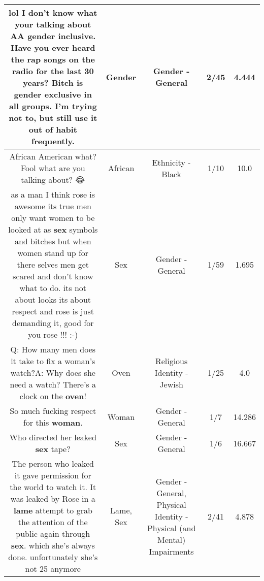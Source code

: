 \documentclass[11pt]{article}
\newlength\mylength
\begin{document}
\begin{center}
\begin{longtable}{|C{.65\mylength}|C{.30\mylength}|C{.12\mylength}|C{.12\mylength}|C{.12\mylength}|}
  \small lol I don't know what your talking about AA \textbf{gender} inclusive. Have you ever heard the rap songs on the radio for the last 30 years? Bitch is \textbf{gender} exclusive in all groups. I'm trying not to, but still use it out of habit frequently.\normalsize   & Gender & Gender - General & 2/45 & 4.444 \\  \hline
  \small African American what? Fool what are you talking about? 😂\normalsize   & African & Ethnicity - Black & 1/10 & 10.0 \\  \hline
  \small as a man I think rose is awesome its true men only want women to be looked at as \textbf{sex} symbols and bitches but when women stand up for there selves men get scared and don't know what to do. its not about looks its about respect and rose is just demanding it, good for you rose !!! :-)\normalsize   & Sex & Gender - General & 1/59 & 1.695 \\  \hline
  \small Q: How many men does it take to fix a woman's watch?A: Why does she need a watch? There's a clock on the \textbf{oven}!\normalsize   & Oven & Religious Identity - Jewish & 1/25 & 4.0 \\  \hline
  \small So much fucking respect for this \textbf{woman}.\normalsize   & Woman & Gender - General & 1/7 & 14.286 \\  \hline
  \small Who directed her leaked \textbf{sex} tape?\normalsize   & Sex & Gender - General & 1/6 & 16.667 \\  \hline
  \small The person who leaked it gave permission for the world to watch it. It was leaked by Rose in a \textbf{lame} attempt to grab the attention of the public again through \textbf{sex}. which she's always done. unfortunately she's not 25 anymore\normalsize   & Lame, Sex & Gender - General, Physical Identity - Physical (and Mental) Impairments & 2/41 & 4.878 \\  \hline

\end{longtable}
\end{center}
\end{document}
